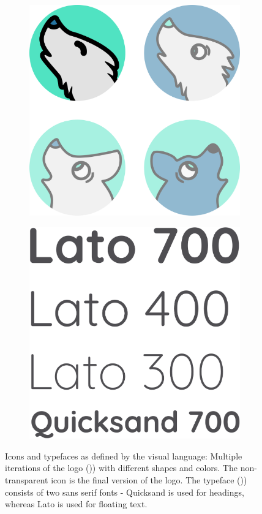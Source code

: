 \documentclass[12pt,numbers=noenddot,parskip,bibliography=totocnumbered,listof=totocnumbered]{scrreprt}
\begin{document}
\begin{figure}
\begin{subfigure}[t]{0.45\textwidth}
\centering
\includegraphics[width=\linewidth]{icons.png}
\caption{}
\label{icons}
\end{subfigure}
\hfill
\begin{subfigure}[t]{0.45\textwidth}
\centering
\includegraphics[width=\linewidth]{fonts.png}
\caption{}
\label{fonts}
\end{subfigure}
\caption[Icons and typefaces]{Icons and typefaces as defined by the visual language: Multiple iterations of the logo ()) with different shapes and colors. The non-transparent icon is the final version of the logo. The typeface ()) consists of two sans serif fonts - Quicksand is used for headings, whereas Lato is used for floating text.}
\end{figure}
\end{document}
